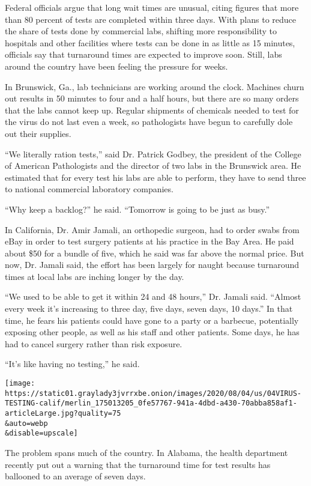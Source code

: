 Federal officials argue that long wait times are unusual, citing figures
that more than 80 percent of tests are completed within three days. With
plans to reduce the share of tests done by commercial labs, shifting
more responsibility to hospitals and other facilities where tests can be
done in as little as 15 minutes, officials say that turnaround times are
expected to improve soon. Still, labs around the country have been
feeling the pressure for weeks.

In Brunswick, Ga., lab technicians are working around the clock.
Machines churn out results in 50 minutes to four and a half hours, but
there are so many orders that the labs cannot keep up. Regular shipments
of chemicals needed to test for the virus do not last even a week, so
pathologists have begun to carefully dole out their supplies.

``We literally ration tests,'' said Dr. Patrick Godbey, the president of
the College of American Pathologists and the director of two labs in the
Brunswick area. He estimated that for every test his labs are able to
perform, they have to send three to national commercial laboratory
companies.

``Why keep a backlog?'' he said. ``Tomorrow is going to be just as
busy.''

In California, Dr. Amir Jamali, an orthopedic surgeon, had to order
swabs from eBay in order to test surgery patients at his practice in the
Bay Area. He paid about \$50 for a bundle of five, which he said was far
above the normal price. But now, Dr. Jamali said, the effort has been
largely for naught because turnaround times at local labs are inching
longer by the day.

``We used to be able to get it within 24 and 48 hours,'' Dr. Jamali
said. ``Almost every week it's increasing to three day, five days, seven
days, 10 days.'' In that time, he fears his patients could have gone to
a party or a barbecue, potentially exposing other people, as well as his
staff and other patients. Some days, he has had to cancel surgery rather
than risk exposure.

``It's like having no testing,'' he said.

\texttt{[image: https://static01.graylady3jvrrxbe.onion/images/2020/08/04/us/04VIRUS-TESTING-calif/merlin\_175013205\_0fe57767-941a-4dbd-a430-70abba858af1-articleLarge.jpg?quality=75\\\&auto=webp\\\&disable=upscale]}

The problem spans much of the country. In Alabama, the health department
recently put out a warning that the turnaround time for test results has
ballooned to an average of seven days.

